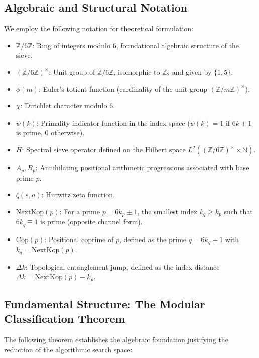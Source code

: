 \documentclass{article}
\numberwithin{equation}{section}
\newcommand{\ZZ}{\mathbb{Z}}
\newcommand{\NN}{\mathbb{N}}
\theoremstyle{plain}
\theoremstyle{definition}
\begin{document}
\subsection{Algebraic and Structural Notation}

We employ the following notation for theoretical formulation:
\begin{itemize}
    \item $\ZZ/6\ZZ$: Ring of integers modulo 6, foundational algebraic structure of the sieve.
    \item $(\ZZ/6\ZZ)^\times$: Unit group of $\ZZ/6\ZZ$, isomorphic to $\ZZ_2$ and given by $\{1, 5\}$.
    \item $\phi(m)$: Euler's totient function (cardinality of the unit group $(\ZZ/m\ZZ)^\times$).
    \item $\chi$: Dirichlet character modulo 6.
    \item $\psi(k)$: Primality indicator function in the index space ($\psi(k) = 1$ if $6k\pm1$ is prime, $0$ otherwise).
    \item $\hat{H}$: Spectral sieve operator defined on the Hilbert space $L^2((\ZZ/6\ZZ)^\times \times \NN)$.
    \item $A_p, B_p$: Annihilating positional arithmetic progressions associated with base prime $p$.
    \item $\zeta(s, a)$: Hurwitz zeta function.
    \item $\mathrm{NextKop}(p)$: For a prime $p = 6k_p \pm 1$, the smallest index $k_q \ge k_p$ such that $6k_q \mp 1$ is prime (opposite channel form).
    \item $\mathrm{Cop}(p)$: Positional coprime of $p$, defined as the prime $q = 6k_q \mp 1$ with $k_q = \mathrm{NextKop}(p)$.
    \item $\Delta k$: Topological entanglement jump, defined as the index distance $\Delta k = \mathrm{NextKop}(p) - k_p$.
\end{itemize}

\subsection{Fundamental Structure: The Modular Classification Theorem}

The following theorem establishes the algebraic foundation justifying the reduction of the algorithmic search space:
\end{document}
